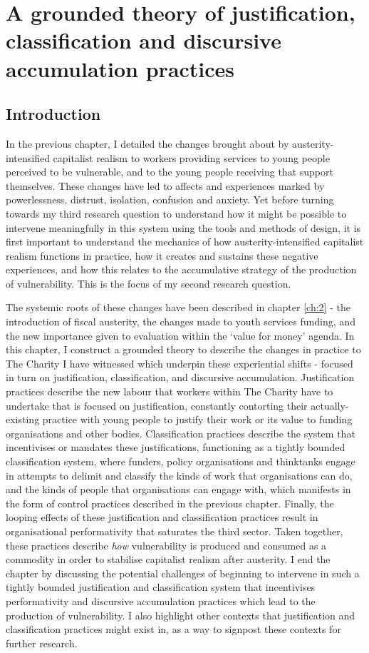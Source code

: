 \chapter{A grounded theory of justification, classification and discursive accumulation practices}
\label{ch:6}

\section{Introduction}
\label{sec:6-1-intro}
In the previous chapter, I detailed the changes brought about by austerity-intensified capitalist realism to workers providing services to young people perceived to be vulnerable, and to the young people receiving that support themselves. These changes have led to affects and experiences marked by powerlessness, distrust, isolation, confusion and anxiety. Yet before turning towards my third research question to understand how it might be possible to intervene meaningfully in this system using the tools and methods of design, it is first important to understand the mechanics of how austerity-intensified capitalist realism functions in practice, how it creates and sustains these negative experiences, and how this relates to the accumulative strategy of the production of vulnerability. This is the focus of my second research question.

The systemic roots of these changes have been described in chapter \ref{ch:2} - the introduction of fiscal austerity, the changes made to youth services funding, and the new importance given to evaluation within the ‘value for money’ agenda. In this chapter, I construct a grounded theory to describe the changes in practice to The Charity I have witnessed which underpin these experiential shifts - focused in turn on justification, classification, and discursive accumulation. Justification practices describe the new labour that workers within The Charity have to undertake that is focused on justification, constantly contorting their actually-existing practice with young people to justify their work or its value to funding organisations and other bodies. Classification practices describe the system that incentivises or mandates these justifications, functioning as a tightly bounded classification system, where funders, policy organisations and thinktanks engage in attempts to delimit and classify the kinds of work that organisations can do, and the kinds of people that organisations can engage with, which manifests in the form of control practices described in the previous chapter. Finally, the looping effects of these justification and classification practices result in organisational performativity that saturates the third sector. Taken together, these practices describe \emph{how} vulnerability is produced and consumed as a commodity in order to stabilise capitalist realism after austerity.  I end the chapter by discussing the potential challenges of beginning to intervene in such a tightly bounded justification and classification system that incentivises performativity and discursive accumulation practices which lead to the production of vulnerability. I also highlight other contexts that justification and classification practices might exist in, as a way to signpost these contexts for further research. 

